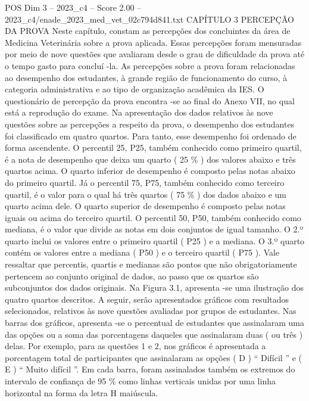 \begin{textsample}{POS Dim 3 – 2023\_c4 – Score 2.00 – 2023\_c4/enade\_2023\_med\_vet\_02c794d841.txt}  \label{ex:f3_pos_093}
CAPÍTULO 3 PERCEPÇÃO DA PROVA Neste capítulo, constam as percepções dos concluintes da área de Medicina Veterinária sobre a prova aplicada.
Essas percepções foram mensuradas por meio de nove questões que avaliaram desde o grau de dificuldade da prova até o tempo gasto para concluí -la.
As percepções sobre a prova foram relacionadas ao desempenho dos estudantes, à grande região de funcionamento do curso, à categoria administrativa e ao tipo de organização acadêmica da IES.
O questionário de percepção da prova encontra -se ao final do Anexo VII, no qual está a reprodução do exame.
Na apresentação dos dados relativos às nove questões sobre as percepções a respeito da prova, o desempenho dos estudantes foi classificado em quatro quartos.
Para tanto, esse desempenho foi ordenado de forma ascendente.
O percentil 25, P25, também conhecido como primeiro quartil, é a nota de desempenho que deixa um quarto ( 25 \% ) dos valores abaixo e três quartos acima.
O quarto inferior de desempenho é composto pelas notas abaixo do primeiro quartil.
Já o percentil 75, P75, também conhecido como terceiro quartil, é o valor para o qual há três quartos ( 75 \% ) dos dados abaixo e um quarto acima dele.
O quarto superior de desempenho é composto pelas notas iguais ou acima do terceiro quartil.
O percentil 50, P50, também conhecido como mediana, é o valor que divide as notas em dois conjuntos de igual tamanho.
O 2.º quarto inclui os valores entre o primeiro quartil ( P25 ) e a mediana.
O 3.º quarto contém os valores entre a mediana ( P50 ) e o terceiro quartil ( P75 ).
Vale ressaltar que percentis, quartis e medianas são pontos que não obrigatoriamente pertencem ao conjunto original de dados, ao passo que os quartos são subconjuntos dos dados originais.
Na Figura 3.1, apresenta -se uma ilustração dos quatro quartos descritos.
A seguir, serão apresentados gráficos com resultados selecionados, relativos às nove questões avaliadas por grupos de estudantes.
Nas barras dos gráficos, apresenta -se o percentual de estudantes que assinalaram uma das opções ou a soma das porcentagens daqueles que assinalaram duas ( ou três ) delas.
Por exemplo, para as questões 1 e 2, nos gráficos é apresentada a porcentagem total de participantes que assinalaram as opções ( D ) “ Difícil ” e ( E ) “ Muito difícil ”.
Em cada barra, foram assinalados também os extremos do intervalo de confiança de 95 \% como linhas verticais unidas por uma linha horizontal na forma da letra H maiúscula.

\end{textsample}
